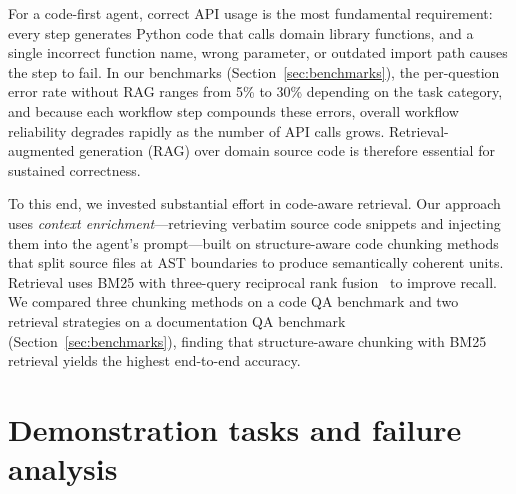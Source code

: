 \documentclass{article}
\begin{document}
For a code-first agent, correct API usage is the most fundamental requirement: every step generates Python code that calls domain library functions, and a single incorrect function name, wrong parameter, or outdated import path causes the step to fail.
In our benchmarks (Section~\ref{sec:benchmarks}), the per-question error rate without RAG ranges from 5\% to 30\% depending on the task category, and because each workflow step compounds these errors, overall workflow reliability degrades rapidly as the number of API calls grows.
Retrieval-augmented generation (RAG) over domain source code is therefore essential for sustained correctness.

To this end, we invested substantial effort in code-aware retrieval.
Our approach uses \emph{context enrichment}---retrieving verbatim source code snippets and injecting them into the agent's prompt---built on structure-aware code chunking methods~\citep{Zhang2025cast,codechunk} that split source files at AST boundaries to produce semantically coherent units.
Retrieval uses BM25 with three-query reciprocal rank fusion~\citep{Cormack2009} to improve recall.
We compared three chunking methods on a code QA benchmark and two retrieval strategies on a documentation QA benchmark (Section~\ref{sec:benchmarks}), finding that structure-aware chunking with BM25 retrieval yields the highest end-to-end accuracy.

\section{Demonstration tasks and failure analysis}
\label{sec:demos}
\end{document}
